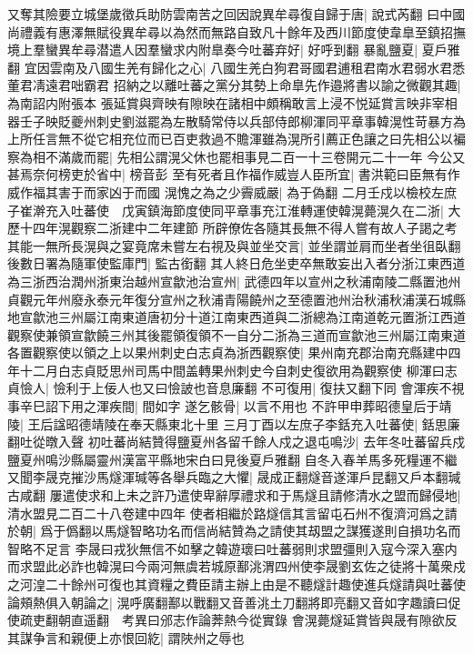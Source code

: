 又奪其險要立城堡歲徵兵助防雲南苦之回因說異牟尋復自歸于唐|{
	說式芮翻}
曰中國尚禮義有惠澤無賦役異牟尋以為然而無路自致凡十餘年及西川節度使韋臯至鎮招撫境上羣蠻異牟尋潜遣人因羣蠻求内附臯奏今吐蕃弃好|{
	好呼到翻}
暴亂鹽夏|{
	夏戶雅翻}
宜因雲南及八國生羌有歸化之心|{
	八國生羌白狗君哥國君逋租君南水君弱水君悉董君凊遠君咄霸君}
招納之以離吐蕃之黨分其勢上命臯先作邉將書以諭之微觀其趣|{
	為南詔内附張本}
張延賞與齊映有隙映在諸相中頗稱敢言上浸不悦延賞言映非宰相器壬子映貶夔州刺史劉滋罷為左散騎常侍以兵部侍郎柳渾同平章事韓滉性苛暴方為上所任言無不從它相充位而已百吏救過不贍渾雖為滉所引薦正色讓之曰先相公以褊察為相不滿歲而罷|{
	先相公謂滉父休也罷相事見二百一十三卷開元二十一年}
今公又甚焉奈何榜吏於省中|{
	榜音彭}
至有死者且作福作威豈人臣所宜|{
	書洪範曰臣無有作威作福其害于而家凶于而國}
滉愧之為之少霽威嚴|{
	為于偽翻}
二月壬戍以檢校左庶子崔澣充入吐蕃使　戊寅鎮海節度使同平章事充江淮轉運使韓滉薨滉久在二浙|{
	大歷十四年滉觀察二浙建中二年建節}
所辟僚佐各隨其長無不得人嘗有故人子謁之考其能一無所長滉與之宴竟席未嘗左右視及與並坐交言|{
	並坐謂並肩而坐者坐徂臥翻}
後數日署為隨軍使監庫門|{
	監古銜翻}
其人終日危坐吏卒無敢妄出入者分浙江東西道為三浙西治潤州浙東治越州宣歙池治宣州|{
	武德四年以宣州之秋浦南陵二縣置池州貞觀元年州廢永泰元年復分宣州之秋浦青陽饒州之至德置池州治秋浦秋浦漢石城縣地宣歙池三州屬江南東道唐初分十道江南東西道與二浙總為江南道乾元置浙江西道觀察使兼領宣歙饒三州其後罷領復領不一自分二浙為三道而宣歙池三州屬江南東道}
各置觀察使以領之上以果州刺史白志貞為浙西觀察使|{
	果州南充郡治南充縣建中四年十二月白志貞貶思州司馬中間盖轉果州刺史今自刺史復欲用為觀察使}
柳渾曰志貞憸人|{
	憸利于上佞人也又曰憸詖也音息廉翻}
不可復用|{
	復扶又翻下同}
會渾疾不視事辛巳詔下用之渾疾間|{
	間如字}
遂乞骸骨|{
	以言不用也}
不許甲申葬昭德皇后于靖陵|{
	王后諡昭德靖陵在奉天縣東北十里}
三月丁酉以左庶子李銛充入吐蕃使|{
	銛思廉翻吐從暾入聲}
初吐蕃尚結贊得鹽夏州各留千餘人戍之退屯鳴沙|{
	去年冬吐蕃留兵戍鹽夏州鳴沙縣屬靈州漢富平縣地宋白曰見後夏戶雅翻}
自冬入春羊馬多死糧運不繼又聞李晟克摧沙馬燧渾瑊等各舉兵臨之大懼|{
	晟成正翻燧音遂渾戶昆翻又戶本翻瑊古咸翻}
屢遣使求和上未之許乃遣使卑辭厚禮求和于馬燧且請修清水之盟而歸侵地|{
	清水盟見二百二十八卷建中四年}
使者相繼於路燧信其言留屯石州不復濟河爲之請於朝|{
	爲于僞翻以馬燧智略功名而信尚結贊為之請使其刼盟之謀獲遂則自損功名而智略不足言}
李晟曰戎狄無信不如擊之韓遊瓌曰吐蕃弱則求盟彊則入寇今深入塞内而求盟此必詐也韓滉曰今兩河無虞若城原鄯洮渭四州使李晟劉玄佐之徒將十萬衆戍之河湟二十餘州可復也其資糧之費臣請主辦上由是不聽燧計趣使進兵燧請與吐蕃使論頰熱俱入朝論之|{
	滉呼廣翻鄯以戰翻又音善洮土刀翻將即亮翻又音如字趣讀曰促使疏吏翻朝直遥翻　考異曰邠志作論莾熱今從實錄}
會滉薨燧延賞皆與晟有隙欲反其謀争言和親便上亦恨回紇|{
	謂陜州之辱也}

